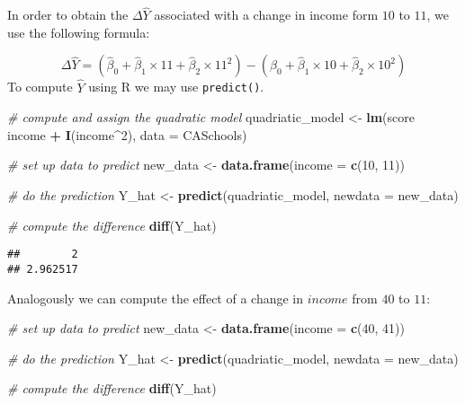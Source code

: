 \documentclass[]{book}
\newenvironment{Shaded}{\begin{snugshade}}{\end{snugshade}}
\newcommand{\KeywordTok}[1]{\textcolor[rgb]{0.13,0.29,0.53}{\textbf{#1}}}
\newcommand{\DataTypeTok}[1]{\textcolor[rgb]{0.13,0.29,0.53}{#1}}
\newcommand{\DecValTok}[1]{\textcolor[rgb]{0.00,0.00,0.81}{#1}}
\newcommand{\StringTok}[1]{\textcolor[rgb]{0.31,0.60,0.02}{#1}}
\newcommand{\CommentTok}[1]{\textcolor[rgb]{0.56,0.35,0.01}{\textit{#1}}}
\newcommand{\OperatorTok}[1]{\textcolor[rgb]{0.81,0.36,0.00}{\textbf{#1}}}
\newcommand{\NormalTok}[1]{#1}
\theoremstyle{definition}
\theoremstyle{definition}
\theoremstyle{definition}
\theoremstyle{remark}
\begin{document}
In order to obtain the \(\Delta \hat{Y}\) associated with a change in
income form \(10\) to \(11\), we use the following formula:

\[\Delta \hat{Y} = \left(\hat{\beta}_0 + \hat{\beta}_1 \times 11 + \hat{\beta}_2 \times 11^2\right) - \left(\hat{\beta}_0 + \hat{\beta}_1 \times 10 + \hat{\beta}_2 \times 10^2\right) \]
To compute \(\hat{Y}\) using R we may use \texttt{predict()}.

\begin{Shaded}
\begin{Highlighting}[]
\CommentTok{# compute and assign the quadratic model}
\NormalTok{quadriatic_model <-}\StringTok{ }\KeywordTok{lm}\NormalTok{(score }\OperatorTok{~}\StringTok{ }\NormalTok{income }\OperatorTok{+}\StringTok{ }\KeywordTok{I}\NormalTok{(income}\OperatorTok{^}\DecValTok{2}\NormalTok{), }\DataTypeTok{data =}\NormalTok{ CASchools)}

\CommentTok{# set up data to predict}
\NormalTok{new_data <-}\StringTok{ }\KeywordTok{data.frame}\NormalTok{(}\DataTypeTok{income =} \KeywordTok{c}\NormalTok{(}\DecValTok{10}\NormalTok{, }\DecValTok{11}\NormalTok{))}

\CommentTok{# do the prediction}
\NormalTok{Y_hat <-}\StringTok{ }\KeywordTok{predict}\NormalTok{(quadriatic_model, }\DataTypeTok{newdata =}\NormalTok{ new_data)}

\CommentTok{# compute the difference}
\KeywordTok{diff}\NormalTok{(Y_hat)}
\end{Highlighting}
\end{Shaded}

\begin{verbatim}
##        2 
## 2.962517
\end{verbatim}

Analogously we can compute the effect of a change in \(income\) from
\(40\) to \(11\):

\begin{Shaded}
\begin{Highlighting}[]
\CommentTok{# set up data to predict}
\NormalTok{new_data <-}\StringTok{ }\KeywordTok{data.frame}\NormalTok{(}\DataTypeTok{income =} \KeywordTok{c}\NormalTok{(}\DecValTok{40}\NormalTok{, }\DecValTok{41}\NormalTok{))}

\CommentTok{# do the prediction}
\NormalTok{Y_hat <-}\StringTok{ }\KeywordTok{predict}\NormalTok{(quadriatic_model, }\DataTypeTok{newdata =}\NormalTok{ new_data)}

\CommentTok{# compute the difference}
\KeywordTok{diff}\NormalTok{(Y_hat)}
\end{Highlighting}
\end{Shaded}
\end{document}
